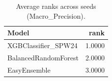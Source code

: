 \begin{table}[t]
\centering
\begin{tabular}{lr}
\toprule
Model & rank \\
\midrule
XGBClassifier_SPW24 & 1.0000 \\
BalancedRandomForest & 2.0000 \\
EasyEnsemble & 3.0000 \\
\bottomrule
\end{tabular}
\caption{Average ranks across seeds (Macro_Precision).}
\label{tab:avg_rank_Macro_Precision}
\end{table}